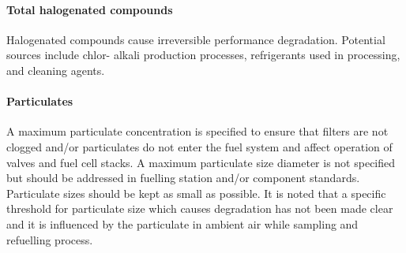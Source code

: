 \paragraph{Total halogenated compounds} 
Halogenated compounds cause irreversible performance degradation. 
Potential sources include chlor- alkali 
production processes, refrigerants used in processing, and cleaning agents.

\paragraph{Particulates}
A maximum particulate concentration is specified to ensure that filters are not clogged and/or particulates 
do not enter the fuel system and affect operation of valves and fuel cell stacks. A maximum particulate size 
diameter is not specified but should be addressed in fuelling station and/or component standards. 
Particulate sizes should be kept as small as possible. It is noted that a specific threshold for 
particulate size which causes degradation has not been made clear and it is influenced by the particulate 
in ambient air while sampling and refuelling process.

